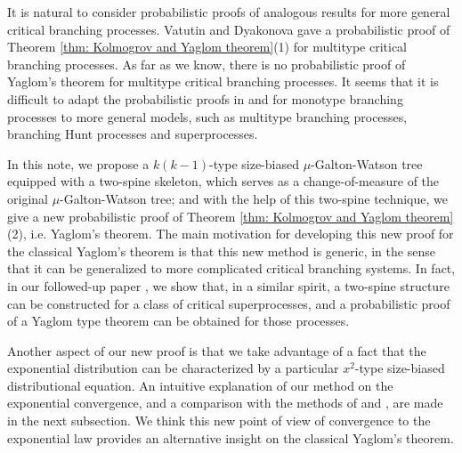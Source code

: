 \documentclass[12pt,a4paper]{amsart}
\numberwithin{equation}{section}
\begin{document}
	It is natural to consider probabilistic proofs of analogous results for more general critical branching processes. Vatutin and  Dyakonova \cite{VD} gave a probabilistic proof of Theorem \ref{thm: Kolmogrov and Yaglom theorem}(1) for multitype critical branching processes.
	As far as we know, there is no probabilistic proof of Yaglom's theorem for multitype critical branching processes. 
	It seems that it is difficult to adapt the probabilistic proofs in \cite{geiger2000new} and \cite{lyons1995conceptual} for monotype branching processes to more general models, such as multitype branching processes, branching Hunt processes and superprocesses.

	In this note, we propose a $k(k-1)$-type size-biased $\mu$-Galton-Watson tree equipped with a two-spine skeleton, which serves as a change-of-measure of the original $\mu$-Galton-Watson tree;
	and with the help of this two-spine technique, we give a new probabilistic proof of Theorem \ref{thm: Kolmogrov and Yaglom theorem}(2), i.e. Yaglom's theorem.
	The main motivation for developing this new proof for the classical Yaglom's theorem is that this new method is generic, in the sense that it can be generalized to more complicated critical %
	branching systems. 
	In fact, in our followed-up paper \cite{RenSongSun2017Spine}, we show that, in a similar spirit, a two-spine structure can be constructed for a class of critical superprocesses, and a probabilistic proof of a Yaglom type theorem can be obtained for those processes. 



	Another aspect of our new proof is that we take advantage of a fact that the exponential %
distribution can be characterized by a particular $x^2$-type size-biased distributional 
equation.
	An intuitive explanation of our method on the exponential convergence, 
and a comparison with the methods of \cite{geiger2000new} and \cite{lyons1995conceptual}, are
	made in the next subsection.  
	We think this new point of view of convergence to the exponential law provides an alternative insight on the classical Yaglom's theorem.
\end{document}
